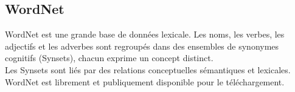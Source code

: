 
    \subsection{WordNet}
    WordNet est une grande base de données lexicale. Les noms, les verbes, les adjectifs et les adverbes sont regroupés dans des ensembles de synonymes cognitifs (Synsets), chacun exprime un concept distinct.\\
    Les Synsets sont liés par des relations conceptuelles sémantiques et lexicales. WordNet est librement et publiquement disponible pour le téléchargement.
